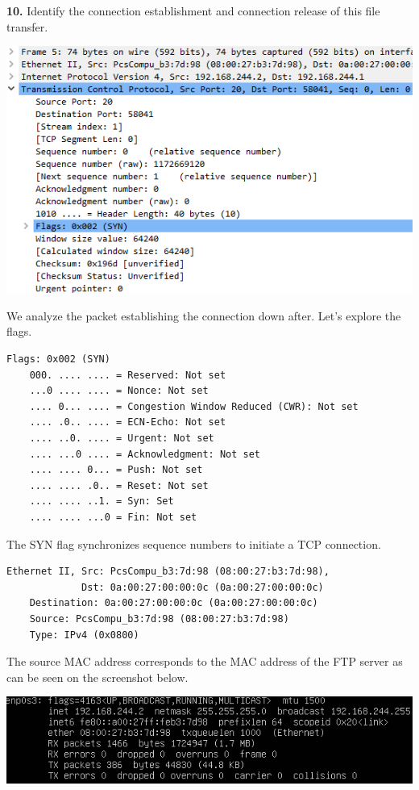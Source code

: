 \documentclass[12pt]{extarticle}
\begin{document}
\textbf{10.} Identify the connection establishment and connection release of this file transfer.
\begin{center}
\includegraphics[scale=0.8]{resources/5-3-1.png}
\end{center}
We analyze the packet establishing the connection down after. Let's explore the flags.
\begin{verbatim}
Flags: 0x002 (SYN)
    000. .... .... = Reserved: Not set
    ...0 .... .... = Nonce: Not set
    .... 0... .... = Congestion Window Reduced (CWR): Not set
    .... .0.. .... = ECN-Echo: Not set
    .... ..0. .... = Urgent: Not set
    .... ...0 .... = Acknowledgment: Not set
    .... .... 0... = Push: Not set
    .... .... .0.. = Reset: Not set
    .... .... ..1. = Syn: Set
    .... .... ...0 = Fin: Not set
\end{verbatim}
The SYN flag synchronizes sequence numbers to initiate a TCP connection.
\begin{verbatim}
Ethernet II, Src: PcsCompu_b3:7d:98 (08:00:27:b3:7d:98),
             Dst: 0a:00:27:00:00:0c (0a:00:27:00:00:0c)
    Destination: 0a:00:27:00:00:0c (0a:00:27:00:00:0c)
    Source: PcsCompu_b3:7d:98 (08:00:27:b3:7d:98)
    Type: IPv4 (0x0800)
\end{verbatim}
The source MAC address corresponds to the MAC address of the FTP server as can be seen on the screenshot below.
\begin{center}
\includegraphics[scale=0.8]{resources/5-3-3.png}
\end{center}
\end{document}
